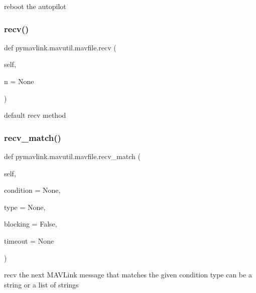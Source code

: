 \begin{DoxyVerb}reboot the autopilot\end{DoxyVerb}
 \mbox{\label{classpymavlink_1_1mavutil_1_1mavfile_a09cb800fc6b03949ace05ce320539be2}} 
\subsubsection{\texorpdfstring{recv()}{recv()}}
{\footnotesize\ttfamily def pymavlink.\+mavutil.\+mavfile.\+recv (\begin{DoxyParamCaption}\item[{}]{self,  }\item[{}]{n = {\ttfamily None} }\end{DoxyParamCaption})}

\begin{DoxyVerb}default recv method\end{DoxyVerb}
 \mbox{\label{classpymavlink_1_1mavutil_1_1mavfile_a7baa4911cf9de819dc682f2904bf4352}} 
\subsubsection{\texorpdfstring{recv\+\_\+match()}{recv\_match()}}
{\footnotesize\ttfamily def pymavlink.\+mavutil.\+mavfile.\+recv\+\_\+match (\begin{DoxyParamCaption}\item[{}]{self,  }\item[{}]{condition = {\ttfamily None},  }\item[{}]{type = {\ttfamily None},  }\item[{}]{blocking = {\ttfamily False},  }\item[{}]{timeout = {\ttfamily None} }\end{DoxyParamCaption})}

\begin{DoxyVerb}recv the next MAVLink message that matches the given condition
type can be a string or a list of strings\end{DoxyVerb}
 \mbox{\label{classpymavlink_1_1mavutil_1_1mavfile_acf32945bf305666d12d8a1bf32ae6893}} 
